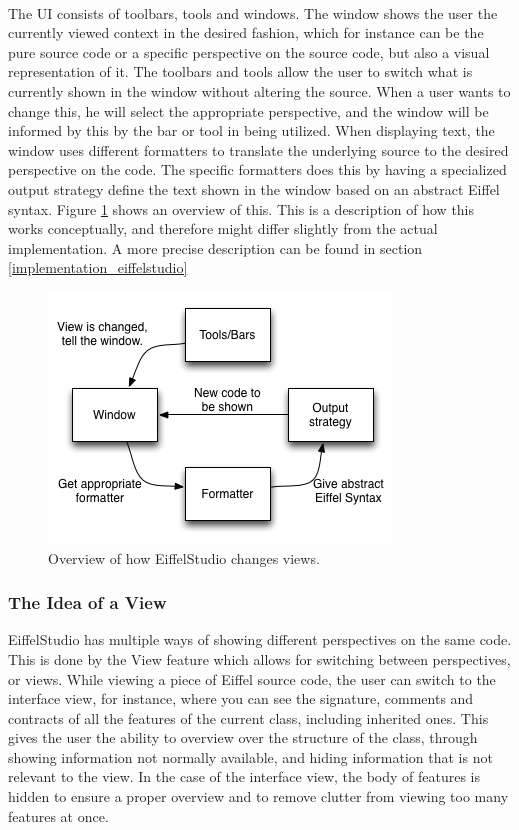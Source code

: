 \paragraph{}
The UI consists of toolbars, tools and windows. The window shows the user the currently viewed context in the desired fashion, which for instance can be the pure source code or a specific perspective on the source code, but also a visual representation of it. The toolbars and tools allow the user to switch what is currently shown in the window without altering the source. When a user wants to change this, he will select the appropriate perspective, and the window will be informed by this by the bar or tool in being utilized. When displaying text, the window uses different formatters to translate the underlying source to the desired perspective on the code. The specific formatters does this by having a specialized output strategy define the text shown in the window based on an abstract Eiffel syntax. Figure \ref{fig:eiffelstudio_view_change} shows an overview of this. This is a description of how this works conceptually, and therefore might differ slightly from the actual implementation. A more precise description can be found in section \ref{implementation_eiffelstudio}

\begin{figure}[H]
\centerline{
\includegraphics[scale=0.7]{images/eiffel_view_text_design.png}
}
\caption[EiffelStudio view control]{Overview of how EiffelStudio changes views.}
\label{fig:eiffelstudio_view_change}
\end{figure}

\subsubsection{The Idea of a View}
\label{why_a_view}
EiffelStudio has multiple ways of showing different perspectives on the same code. This is done by the View feature which allows for switching between perspectives, or views. While viewing a piece of Eiffel source code, the user can switch to the interface view, for instance, where you can see the signature, comments and contracts of all the features  of the current class, including inherited ones. This gives the user the ability to overview over the structure of the class, through showing information not normally available, and hiding information that is not relevant to the view. In the case of the interface view, the body of features is hidden to ensure a proper overview and to remove clutter from viewing too many features at once.
